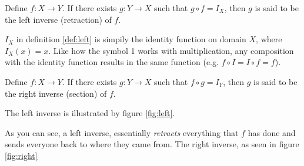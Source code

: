 \documentclass[11pt]{article}
\numberwithin{lemma}{section}
\numberwithin{equation}{section}
\numberwithin{define}{section}
\numberwithin{prop}{section}
\numberwithin{figure}{section}
\numberwithin{theorem}{section}
\newcounter{ex}[section]
\numberwithin{ex}{section}
\begin{document}
\begin{define}
\label{def:left}
	Define $f:X\to Y$. If there exists $g:Y\to X$ such that $g\circ f=I_X$, then $g$ is said to be the left inverse (retraction) of $f$.
	\end{define}
$I_X$ in definition \eqref{def:left} is simpily the identity function on domain $X$, where $I_X(x)=x$. Like how the symbol 1 works with multiplication, any composition with the identity function results in the same function (e.g. $f\circ I=I\circ f=f$).
\begin{define}
	Define $f:X\to Y$. If there exists $g:Y\to X$ such that $f\circ g=I_Y$, then $g$ is said to be the right inverse (section) of $f$. 
\end{define}

The left inverse is illustrated by figure \eqref{fig:left}.
\begin{figure}[h]
\centering
{}
	\caption{}
	\label{fig:left}
\end{figure}
As you can see, a left inverse, essentially \textit{retracts} everything that $f$ has done and sends everyone back to where they came from.
The right inverse, as seen in figure \eqref{fig:right}
\end{document}
